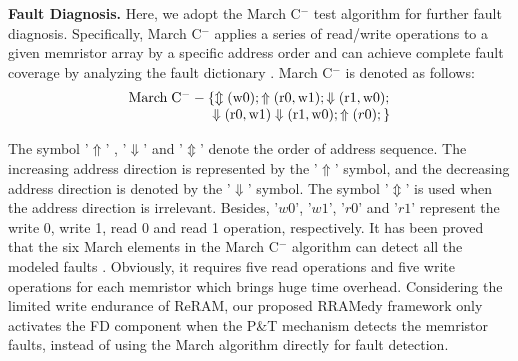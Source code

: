 {\bf Fault Diagnosis.} Here, we adopt the March C${^-}$ test algorithm for further fault diagnosis.  Specifically, March C${^-}$ applies a series of read/write operations to a given memristor array by a specific address order and can achieve complete fault coverage by analyzing the fault dictionary \cite{Wang2006VLSI}. March C${^-}$ is denoted as follows:                                                                                                                                                                                                                                                               
\begin{equation}
    \setlength{\abovedisplayskip}{-5pt}
    \setlength{\belowdisplayskip}{-1pt}
    \begin{array}{*{20}{l}}{\rm{March}}\;{{\rm{C}}^ - } - \{  \Updownarrow ({\rm{w0}}); \Uparrow ({\rm{r0}},{\rm{w1}}); \Downarrow ({\rm{r1}},{\rm{w0}}); \\ \qquad \qquad \qquad \Downarrow ({\rm{r0}},{\rm{w1}}) \Downarrow ({\rm{r1}},{\rm{w0}}); \Uparrow (r0);\} 
    \end{array}
\end{equation}
                                                                                                                                                                                                                                                                                                                                
The symbol  '$\Uparrow$' , '$\Downarrow$' and '$\Updownarrow$' denote the order of address sequence. The increasing address direction is represented by the '$\Uparrow$' symbol, and the decreasing address direction is denoted by the  '$\Downarrow$' symbol. The symbol '$\Updownarrow$' is used when the address direction is irrelevant. Besides, '$w0$', '$w1$', '$r0$' and '$r1$' represent the write 0, write 1, read 0 and read 1 operation, respectively. It has been proved that the six March elements in the March C${^-}$ algorithm can detect all the modeled faults \cite{7551274}. Obviously, it requires five read operations and five write operations for each memristor which brings huge time overhead. Considering the limited write endurance of ReRAM, our proposed RRAMedy framework only activates the FD component  when the P\&T mechanism detects the memristor faults, instead of using the March algorithm directly for fault detection. 


